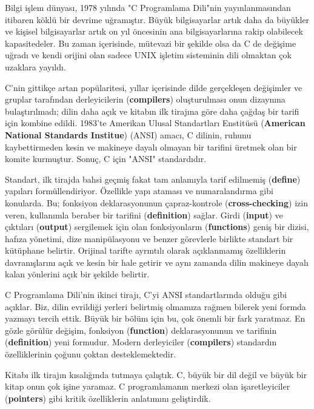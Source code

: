 \documentclass[a4paper,12pt,oneside]{book}
\begin{document}
Bilgi işlem dünyası, 1978 yılında "C Programlama Dili"nin yayınlanmasından itibaren köklü bir devrime uğramıştır. Büyük bilgisayarlar artık daha da büyükler ve kişisel bilgisayarlar artık on yıl öncesinin ana bilgisayarlarına rakip olabilecek kapasitedeler. Bu zaman içerisinde, mütevazi bir şekilde olsa da C de değişime uğradı ve kendi orijini olan sadece UNIX işletim sisteminin dili olmaktan çok uzaklara yayıldı.
\par C'nin gittikçe artan popülaritesi, yıllar içerisinde dilde gerçekleşen değişimler ve gruplar tarafından derleyicilerin (\textbf{compilers}) oluşturulması onun dizaynına bulaştırılmadı; dilin daha açık ve kitabın ilk tirajına göre daha çağdaş bir tarifi için kombine edildi. 1983'te Amerikan Ulusal Standartları Enstitüsü (\textbf{American National Standards Institue}) (ANSI) amacı, C dilinin, ruhunu kaybettirmeden kesin ve makineye dayalı olmayan bir tarifini üretmek olan bir komite kurmuştur. Sonuç, C için "ANSI" standardıdır.
\par Standart, ilk tirajda bahsi geçmiş fakat tam anlamıyla tarif edilmemiş (\textbf{define}) yapıları formüllendiriyor. Özellikle yapı ataması ve numaralandırma gibi konularda. Bu; fonksiyon deklarasyonunun çapraz-kontrole (\textbf{cross-checking}) izin veren, kullanımla beraber bir tarifini (\textbf{definition}) sağlar. Girdi (\textbf{input}) ve çıktıları (\textbf{output}) sergilemek için olan fonksiyonların (\textbf{functions}) geniş bir dizisi, hafıza yönetimi, dize manipülasyonu ve benzer görevlerle birlikte standart bir kütüphane belirtir. Orijinal tarifte ayrıntılı olarak açıklanmamış özelliklerin davranışlarını açık ve kesin bir hale getirir ve aynı zamanda dilin makineye dayalı kalan yönlerini açık bir şekilde belirtir.
\par C Programlama Dili'nin ikinci tirajı, C'yi ANSI standartlarında olduğu gibi açıklar. Biz, dilin evrildiği yerleri belirtmiş olmamıza rağmen bilerek yeni formda yazmayı tercih ettik. Büyük bir bölüm için bu, çok önemli bir fark yaratmaz. En gözle görülür değişim, fonksiyon (\textbf{function}) deklarasyonunun ve tarifinin (\textbf{definition}) yeni formudur. Modern derleyiciler (\textbf{compilers}) standardın özelliklerinin çoğunu çoktan desteklemektedir.
\par Kitabı ilk tirajın kısalığında tutmaya çalıştık. C, büyük bir dil değil ve büyük bir kitap onun çok işine yaramaz. C programlamanın merkezi olan işaretleyiciler (\textbf{pointers}) gibi kritik özelliklerin anlatımını geliştirdik. \pagebreak
\end{document}

